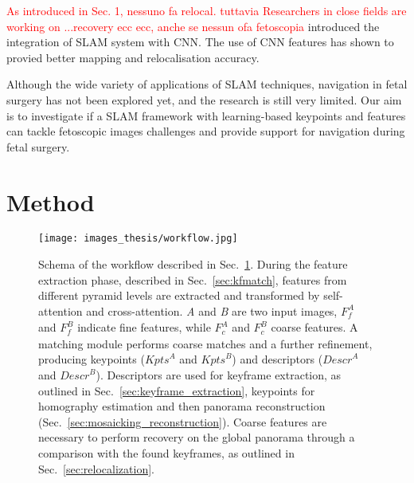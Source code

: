 \documentclass[sn-basic]{sn-jnl}%
\begin{document}

\textcolor{red}{As introduced in Sec. 1, nessuno fa relocal. tuttavia Researchers in close fields are working on ...recovery ecc ecc, anche se nessun ofa fetoscopia}
\cite{Tateno2017} introduced the integration of SLAM system with CNN. The use of CNN features has shown to provied better mapping and relocalisation accuracy.

Although the wide variety of applications of SLAM techniques, navigation in fetal surgery has not been explored yet, and the research is still very limited.
Our aim is to investigate if a SLAM framework with learning-based keypoints and features can tackle fetoscopic images challenges and provide support for navigation during fetal surgery.



\section{Method}\label{sec:method}
\begin{figure}[t!]
\centering
\texttt{[image: images\_thesis/workflow.jpg]}
\caption{Schema of the workflow described in Sec.~\ref{sec:method}. During the feature extraction phase, described in Sec.~\ref{sec:kfmatch}, features from different pyramid levels are extracted and transformed by self-attention and cross-attention. \textit{A} and \textit{B} are two input images, $\mathit{F_{f}^{A}}$ and $\mathit{F_{f}^{B}}$ indicate fine features, while $\mathit{F_{c}^{A}}$ and $\mathit{F_{c}^{B}}$ coarse features. A matching module performs coarse matches and a further refinement, producing keypoints ($\mathit{{Kpts}^{A}}$ and $\mathit{{Kpts}^{B}}$) and descriptors ($\mathit{{Descr}^{A}}$ and $\mathit{{Descr}^{B}}$). Descriptors are used for keyframe extraction, as outlined in Sec.~\ref{sec:keyframe_extraction}, keypoints for homography estimation and then panorama reconstruction (Sec.~\ref{sec:mosaicking_reconstruction}). Coarse features are necessary to perform recovery on the global panorama through a comparison with the found keyframes, as outlined in Sec.~\ref{sec:relocalization}.}
\label{fig:workflow}
\end{figure}
\end{document}
